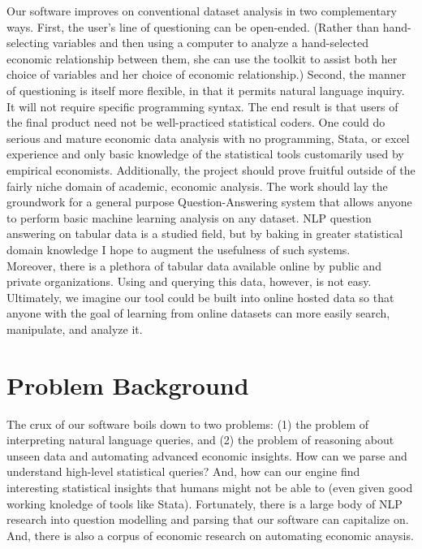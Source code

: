 \documentclass[pageno]{jpaper}
\begin{document}
Our software improves on conventional dataset analysis in two complementary ways. First, the user’s line of questioning can be open-ended. (Rather than hand-selecting variables and then using a computer to analyze a hand-selected economic relationship between them, she can use the toolkit to assist both her choice of variables and her choice of economic relationship.) Second, the manner of questioning is itself more flexible, in that it permits natural language inquiry. It will not require specific programming syntax. The end result is that users of the final product need not be well-practiced statistical coders. One could do serious and mature economic data analysis with no programming, Stata, or excel experience and only basic knowledge of the statistical tools customarily used by empirical economists.
Additionally, the project should prove fruitful outside of the fairly niche domain of academic, economic analysis. The work should lay the groundwork for a general purpose Question-Answering system that allows anyone to perform basic machine learning analysis on any dataset. NLP question answering on tabular data is a studied field, but by baking in greater statistical domain knowledge I hope to augment the usefulness of such systems.
\\
Moreover, there is a  plethora of tabular data available online by public and private organizations. Using and querying this data, however, is not easy. Ultimately, we imagine our tool could be built into online hosted data so that anyone with the goal of learning from online datasets can more easily search, manipulate, and analyze it.

\section{Problem Background }

The crux of our software boils down to two problems: (1) the problem of interpreting natural language queries, and (2) the problem of reasoning about unseen data and automating advanced economic insights. How can we parse and understand high-level statistical queries? And, how can our engine find interesting statistical insights that humans might not be able to (even given good working knoledge of tools like Stata).  Fortunately, there is a large body of NLP research into question modelling and parsing that our software can capitalize on. And, there is also a corpus of economic research on automating economic anaysis. \\
\end{document}
